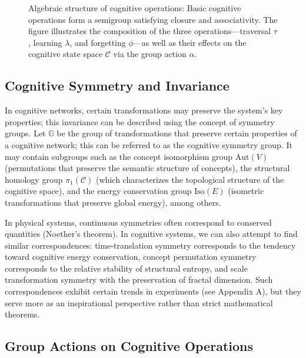 \documentclass[10pt,onecolumn]{article}
\newcommand{\cognitivespace}{\mathcal{C}}
\newcommand{\cognitivegroup}{\mathbb{G}}
\begin{document}
\begin{figure}[H]
\caption{Algebraic structure of cognitive operations: Basic cognitive operations form a semigroup satisfying closure and associativity. The figure illustrates the composition of the three operations—traversal $\tau$, learning $\lambda$, and forgetting $\phi$—as well as their effects on the cognitive state space $\mathcal{C}$ via the group action $\alpha$.}
\label{fig:cognitive_semigroup}
\end{figure}

\subsection{Cognitive Symmetry and Invariance}

In cognitive networks, certain transformations may preserve the system's key properties; this invariance can be described using the concept of symmetry groups. Let $\cognitivegroup$ be the group of transformations that preserve certain properties of a cognitive network; this can be referred to as the cognitive symmetry group. It may contain subgroups such as the concept isomorphism group $\text{Aut}(V)$ (permutations that preserve the semantic structure of concepts), the structural homology group $\pi_1(\cognitivespace)$ (which characterizes the topological structure of the cognitive space), and the energy conservation group $\text{Iso}(E)$ (isometric transformations that preserve global energy), among others.

In physical systems, continuous symmetries often correspond to conserved quantities (Noether’s theorem). In cognitive systems, we can also attempt to find similar correspondences: time-translation symmetry corresponds to the tendency toward cognitive energy conservation, concept permutation symmetry corresponds to the relative stability of structural entropy, and scale transformation symmetry with the preservation of fractal dimension. Such correspondences exhibit certain trends in experiments (see Appendix A), but they serve more as an inspirational perspective rather than strict mathematical theorems.

\subsection{Group Actions on Cognitive Operations}
\end{document}
